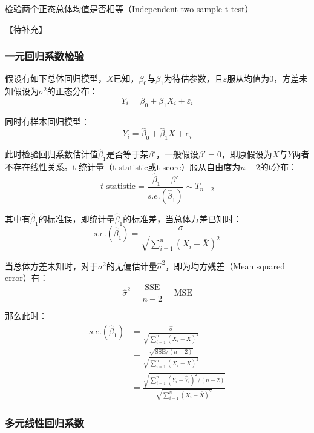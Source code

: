 \documentclass[11pt]{article}
\begin{document}
检验两个正态总体均值是否相等（Independent two-sample t-test）

【待补充】

\subsubsection{一元回归系数检验}

假设有如下总体回归模型，$X$已知，$\beta_0$与$\beta_1$为待估参数，且$\varepsilon$服从均值为0，方差未知假设为$\sigma^2$的正态分布：
\begin{equation*}
    Y_i = \beta_0 + \beta_1 X_i + \varepsilon_i
\end{equation*}

同时有样本回归模型：
\begin{equation*}
    Y_i = \hat{\beta}_0 + \hat{\beta}_1 X + e_i
\end{equation*}

此时检验回归系数估计值$\hat{\beta}_1$是否等于某$\beta'$，一般假设$\beta' = 0$，即原假设为$X$与$Y$两者不存在线性关系。t-统计量（t-statistic或t-score）服从自由度为$n-2$的t分布：
\begin{equation*}
    t\text{-statistic} = \frac{\hat{\beta}_1 - \beta'}{s.e.(\hat{\beta}_1)} \sim T_{n-2}
\end{equation*}

其中有$\hat{\beta}_1$的标准误，即统计量$\hat{\beta}_1$的标准差，当总体方差已知时：
\begin{equation*}
    s.e.(\hat{\beta}_1) = \frac{\sigma}{\sqrt{\sum_{i=1}^{n} (X_i - \bar{X})^2}}
\end{equation*}

当总体方差未知时，对于$\sigma^2$的无偏估计量$\hat{\sigma}^2$，即为均方残差（Mean squared error）有：
\begin{equation*}
    \hat{\sigma}^2 = \frac{\text{SSE}}{n-2} = \text{MSE}
\end{equation*}

那么此时：
\begin{align*}
    s.e.(\hat{\beta}_1) &= \frac{\hat{\sigma}}{\sqrt{\sum_{i=1}^{n} (X_i - \bar{X})^2}} \\
    &= \frac{\sqrt{\text{SSE}/(n-2)}}{\sqrt{\sum_{i=1}^{n} (X_i - \bar{X})^2}} \\
    &= \frac{\sqrt{\sum_{i=1}^{n} (Y_i - \hat{Y}_i)^2 / (n-2)}}{\sqrt{\sum_{i=1}^{n} (X_i - \bar{X})^2}}
\end{align*}

\subsubsection{多元线性回归系数}
\end{document}
